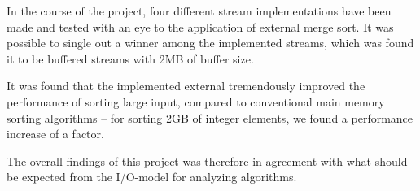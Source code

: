 In the course of the project, four different stream implementations
have been made and tested with an eye to the application of external
merge sort. It was possible to single out a winner among the
implemented streams, which was found it to be buffered streams with
2MB of buffer size.

It was found that the implemented external tremendously improved the
performance of sorting large input, compared to conventional main
memory sorting algorithms -- for sorting 2GB of integer elements, we
found a performance increase of a factor.

The overall findings of this project was therefore in agreement with
what should be expected from the I/O-model for analyzing algorithms.
